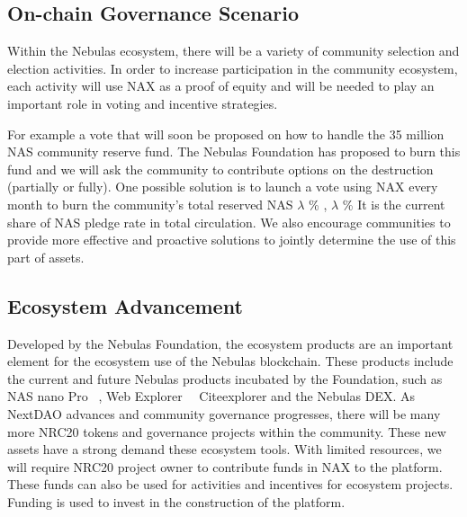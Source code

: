 \subsection{On-chain Governance Scenario}
Within the Nebulas ecosystem, there will be a variety of community selection and election activities. In order to increase participation in the community ecosystem, each activity will use NAX as a proof of equity and will be needed to play an important role in voting and incentive strategies.

For example a vote that will soon be proposed on how to handle the 35 million NAS community reserve fund. The Nebulas Foundation has proposed to burn this fund and we will ask the community to contribute options on the destruction (partially or fully). One possible solution is to launch a vote using NAX every month to burn the community's total reserved NAS \(\lambda\) \% , \(\lambda\) \% It is the current share of NAS pledge rate in total circulation. We also encourage communities to provide more effective and proactive solutions to jointly determine the use of this part of assets.


\subsection{Ecosystem Advancement}
Developed by the Nebulas Foundation, the ecosystem products are an important element for the ecosystem use of the Nebulas blockchain. These products include the current and future Nebulas products incubated by the Foundation, such as NAS nano Pro ~\cite{NASnano}, Web Explorer ~\ Cite{explorer} and the Nebulas DEX. As NextDAO advances and community governance progresses, there will be many more NRC20 tokens and governance projects within the community. These new assets have a strong demand these ecosystem tools. With limited resources, we will require NRC20 project owner to contribute funds in NAX to the platform. These funds can also be used for activities and incentives for ecosystem projects. Funding is used to invest in the construction of the platform.
